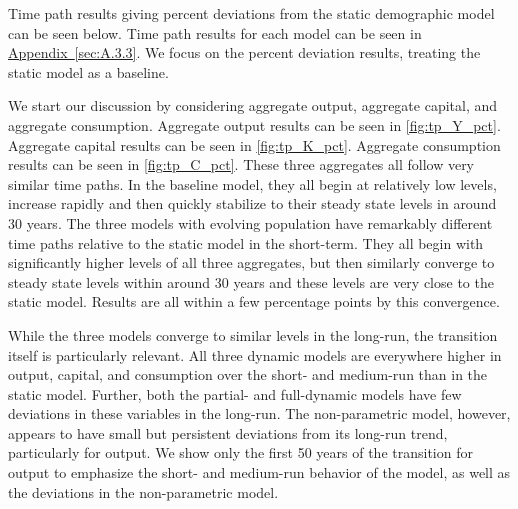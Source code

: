 \documentclass[10pt]{article}
\renewcommand{\thesection}{\arabic{section}}
\renewcommand{\thesubsection}{\thesection.\arabic{subsection}}
\newcommand{\aref}[1]{\hyperref[#1]{Appendix~\ref{#1}}}
\renewcommand{\section}[2][]{\oldsection[#1]{#2}\index{#1}\label{sec:\thesection}}
\renewcommand{\subsection}[2][]{\oldsubsection[#1]{#2}\index{#1}\label{sec:\thesubsection}}
\numberwithin{equation}{subsection}
\begin{document}

\subsection{Time Path}
\par Time path results giving percent deviations from the static demographic model can be seen below. Time path results for each model can be seen in \aref{sec:A.3.3}. We focus on the percent deviation results, treating the static model as a baseline.

\par We start our discussion by considering aggregate output, aggregate capital, and aggregate consumption. Aggregate output results can be seen in \autoref{fig:tp_Y_pct}. Aggregate capital results can be seen in \autoref{fig:tp_K_pct}. Aggregate consumption results can be seen in \autoref{fig:tp_C_pct}. These three aggregates all follow very similar time paths. In the baseline model, they all begin at relatively low levels, increase rapidly and then quickly stabilize to their steady state levels in around 30 years. The three models with evolving population have remarkably different time paths relative to the static model in the short-term. They all begin with significantly higher levels of all three aggregates, but then similarly converge to steady state levels within around 30 years and these levels are very close to the static model. Results are all within a few percentage points by this convergence.

\par While the three models converge to similar levels in the long-run, the transition itself is particularly relevant. All three dynamic models are everywhere higher in output, capital, and consumption over the short- and medium-run than in the static model. Further, both the partial- and full-dynamic models have few deviations in these variables in the long-run. The non-parametric model, however, appears to have small but persistent deviations from its long-run trend, particularly for output. We show only the first 50 years of the transition for output to emphasize the short- and medium-run behavior of the model, as well as the deviations in the non-parametric model.
\end{document}
